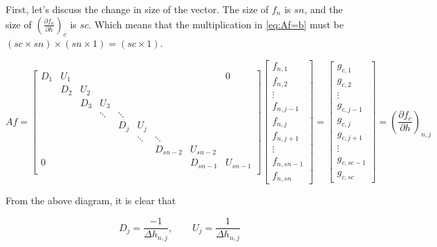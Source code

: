 \documentclass[11pt]{article}
\begin{document}
First, let's discuss the change in size of the vector. The size of $f_n$ is $sn$, and the size of $\left( \frac{\partial f_{n}}{\partial h} \right)_{c}$ is $sc$. Which means that the multiplication in \ref{eq:Af=b} must be $(sc \times sn) \times (sn \times 1) = (sc \times 1)$.

\[
Af =
\left[
\begin{array}{ccccccccc}
D_{1} & U_{1} &  &   &   &   &   &   & 0 \\
  & D_{2} & U_{2} &   &   &   &   &   &   \\
  &   & D_{3} & U_{3} &   &   &   &   &   \\
  &   &  & \ddots & \ddots &   &   &   &   \\
  &   &   &   & D_{j} & U_{j} &   &   &   \\
  &   &   &   &  & \ddots & \ddots &   &   \\
  &   &   &   &   &   & D_{sn-2} & U_{sn-2} &   \\
 0 &   &   &   &   &   &   & D_{sn-1} & U_{sn-1} \\
\end{array}
\right]
\left[ \begin{array}{c}
f_{n,1} \\ f_{n,2} \\ \vdots \\ f_{n,j-1} \\ f_{n,j} \\ f_{n,j+1} \\ \vdots \\ f_{n,sn-1} \\ f_{n,sn}
\end{array} \right]
=
\left[ \begin{array}{c}
g_{c,1} \\ g_{c,2} \\ \vdots \\ g_{c,j-1} \\ g_{c,j} \\ g_{c,j+1} \\ \vdots \\ g_{c,sc-1} \\ g_{c,sc}
\end{array} \right]
 = \left( \frac{\partial f_{c}}{\partial h} \right)_{n,j}
\]

From the above diagram, it is clear that

\begin{equation}
  D_j = \frac{-1}{\Delta h_{n,j}}, \qquad
  U_j = \frac{1}{\Delta h_{n,j}}
\end{equation}
\end{document}
